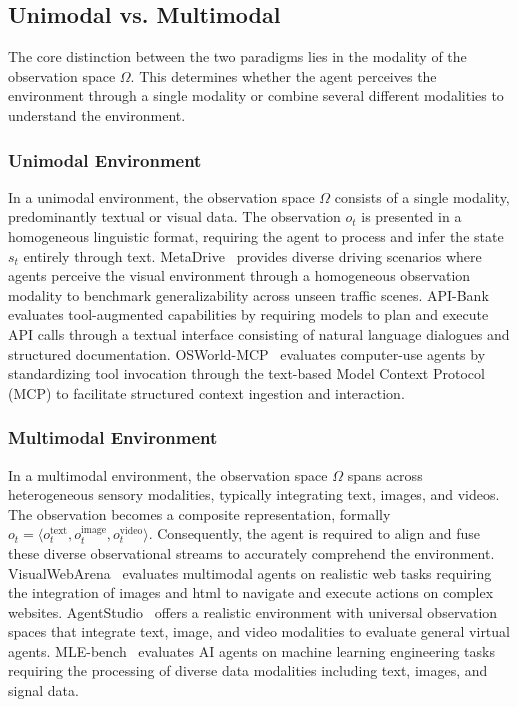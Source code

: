 \subsection{Unimodal vs. Multimodal}
\label{attribute:Unimodal vs. Multimodal}
The core distinction between the two paradigms lies in the modality of the observation space $\Omega$. This determines whether the agent perceives the environment through a single modality or combine several different modalities to understand the environment.

\subsubsection{Unimodal Environment}
In a unimodal environment, the observation space $\Omega$ consists of a single modality, predominantly textual or visual data. The observation $o_t$ is presented in a homogeneous linguistic format, requiring the agent to process and infer the state $s_t$ entirely through text. MetaDrive~\cite{MetaDrive} provides diverse driving scenarios where agents perceive the visual environment through a homogeneous observation modality to benchmark generalizability across unseen traffic scenes. API-Bank~\cite{API-Bank} evaluates tool-augmented capabilities by requiring models to plan and execute API calls through a textual interface consisting of natural language dialogues and structured documentation. OSWorld-MCP~\cite{OSWorld-MCP} evaluates computer-use agents by standardizing tool invocation through the text-based Model Context Protocol (MCP) to facilitate structured context ingestion and interaction.


\subsubsection{Multimodal Environment}
In a multimodal environment, the observation space $\Omega$ spans across heterogeneous sensory modalities, typically integrating text, images, and videos. The observation becomes a composite representation, formally $o_t = \langle o_t^{\text{text}}, o_t^{\text{image}}, o_t^{\text{video}} \rangle$. Consequently, the agent is required to align and fuse these diverse observational streams to accurately comprehend the environment. VisualWebArena~\cite{VisualWebArena} evaluates multimodal agents on realistic web tasks requiring the integration of images and html to navigate and execute actions on complex websites. AgentStudio~\cite{AgentStudio} offers a realistic environment with universal observation spaces that integrate text, image, and video modalities to evaluate general virtual agents. MLE-bench~\cite{MLE-bench} evaluates AI agents on machine learning engineering tasks requiring the processing of diverse data modalities including text, images, and signal data. 


